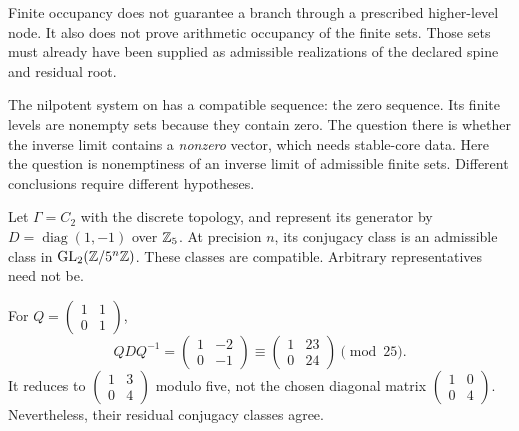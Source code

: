 Finite occupancy does not guarantee a branch through a prescribed higher-level node. It also does not prove arithmetic occupancy of the finite sets. Those sets must already have been supplied as admissible realizations of the declared spine and residual root.

The nilpotent system on  has a compatible sequence: the zero sequence. Its finite levels are nonempty sets because they contain zero. The question there is whether the inverse limit contains a \emph{nonzero} vector, which needs stable-core data. Here the question is nonemptiness of an inverse limit of admissible finite sets. Different conclusions require different hypotheses.


Let $\Gamma=C_2$ with the discrete topology, and represent its generator by $D=\operatorname{diag}(1,-1)$ over $\mathbb Z_5$. At precision $n$, its conjugacy class is an admissible class in $\operatorname{GL}_2(\mathbb Z/5^n\mathbb Z)$. These classes are compatible. Arbitrary representatives need not be.


For $Q=\left(\begin{smallmatrix}1&1\\0&1\end{smallmatrix}\right)$,
\[
QDQ^{-1}=\begin{pmatrix}1&-2\\0&-1\end{pmatrix}
\equiv\begin{pmatrix}1&23\\0&24\end{pmatrix}\pmod{25}.
\]
It reduces to $\left(\begin{smallmatrix}1&3\\0&4\end{smallmatrix}\right)$ modulo five, not the chosen diagonal matrix $\left(\begin{smallmatrix}1&0\\0&4\end{smallmatrix}\right)$. Nevertheless, their residual conjugacy classes agree.

